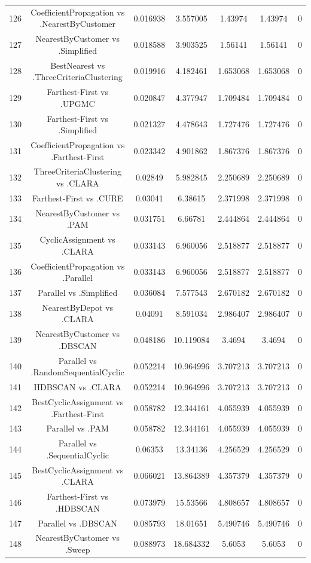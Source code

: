 \documentclass[a4paper,10pt]{article}
\begin{document}
\begin{landscape}
\begin{table}[!htp]
\begin{tabular}{ccccccc}
126&CoefficientPropagation vs .NearestByCustomer&0.016938&3.557005&1.43974&1.43974&0\\
127&NearestByCustomer vs .Simplified&0.018588&3.903525&1.56141&1.56141&0\\
128&BestNearest vs .ThreeCriteriaClustering&0.019916&4.182461&1.653068&1.653068&0\\
129&Farthest-First vs .UPGMC&0.020847&4.377947&1.709484&1.709484&0\\
130&Farthest-First vs .Simplified&0.021327&4.478643&1.727476&1.727476&0\\
131&CoefficientPropagation vs .Farthest-First&0.023342&4.901862&1.867376&1.867376&0\\
132&ThreeCriteriaClustering vs .CLARA&0.02849&5.982845&2.250689&2.250689&0\\
133&Farthest-First vs .CURE&0.03041&6.38615&2.371998&2.371998&0\\
134&NearestByCustomer vs .PAM&0.031751&6.66781&2.444864&2.444864&0\\
135&CyclicAssignment vs .CLARA&0.033143&6.960056&2.518877&2.518877&0\\
136&CoefficientPropagation vs .Parallel&0.033143&6.960056&2.518877&2.518877&0\\
137&Parallel vs .Simplified&0.036084&7.577543&2.670182&2.670182&0\\
138&NearestByDepot vs .CLARA&0.04091&8.591034&2.986407&2.986407&0\\
139&NearestByCustomer vs .DBSCAN&0.048186&10.119084&3.4694&3.4694&0\\
140&Parallel vs .RandomSequentialCyclic&0.052214&10.964996&3.707213&3.707213&0\\
141&HDBSCAN vs .CLARA&0.052214&10.964996&3.707213&3.707213&0\\
142&BestCyclicAssignment vs .Farthest-First&0.058782&12.344161&4.055939&4.055939&0\\
143&Parallel vs .PAM&0.058782&12.344161&4.055939&4.055939&0\\
144&Parallel vs .SequentialCyclic&0.06353&13.34136&4.256529&4.256529&0\\
145&BestCyclicAssignment vs .CLARA&0.066021&13.864389&4.357379&4.357379&0\\
146&Farthest-First vs .HDBSCAN&0.073979&15.53566&4.808657&4.808657&0\\
147&Parallel vs .DBSCAN&0.085793&18.01651&5.490746&5.490746&0\\
148&NearestByCustomer vs .Sweep&0.088973&18.684332&5.6053&5.6053&0\\

\end{tabular}
\end{table}
\end{landscape}
\end{document}
